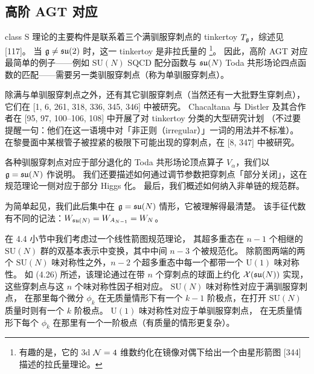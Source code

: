 \subsection{高阶 AGT 对应}

class S 理论的主要构件是联系着三个满驯服穿刺点的 tinkertoy $T_{\mathfrak{g}}$，综述见 [117]。
当 $\mathfrak{g}\ne\mathfrak{su}(2)$ 时，这一 tinkertoy 是非拉氏量的
\footnote{有趣的是，它的 3d $\mathcal{N}=4$ 维数约化在镜像对偶下给出一个由星形箭图 [344] 描述的拉氏量理论。}。
因此，高阶 AGT 对应最简单的例子------例如 $\mathrm{SU}(N)$ SQCD 配分函数与 $\mathfrak{su}(N)$ Toda
共形场论四点函数的匹配------需要另一类驯服穿刺点（称为单驯服穿刺点）。

除满与单驯服穿刺点之外，还有其它驯服穿刺点（当然还有一大批野生穿刺点），
它们在 [1, 6, 261, 318, 336, 345, 346] 中被研究。
Chacaltana 与 Distler 及其合作者在 [95, 97, 100--106, 108] 中开展了对 tinkertoy 分类的大型研究计划
（不过要提醒一句：他们在这一语境中对「非正则（irregular）」一词的用法并不标准）。
在黎曼面中某根管子被捏紧的极限下可能出现的穿刺点，在 [8, 347] 中被研究。

各种驯服穿刺点对应于部分退化的 Toda 共形场论顶点算子 $V_\alpha$，我们以 $\mathfrak{g}=\mathfrak{su}(N)$ 作说明。
我们还要描述如何通过调节参数把穿刺点「部分关闭」，这在规范理论一侧对应于部分 Higgs 化。
最后，我们概述如何纳入非单链的规范群。

为简单起见，我们此后集中在 $\mathfrak{g}=\mathfrak{su}(N)$ 情形，它被理解得最清楚。
该手征代数有不同的记法：$W_{\mathfrak{su}(N)}=W_{A_{N-1}}=W_N$。

在 4.4 小节中我们考虑过一个线性箭图规范理论，
其超多重态在 $n-1$ 个相继的 $\mathrm{SU}(N)$ 群的双基本表示中变换，其中中间 $n-3$ 个被规范化。
除箭图两端的两个 $\mathrm{SU}(N)$ 味对称性之外，$n-2$ 个超多重态中每一个都带一个 $\mathrm{U}(1)$ 味对称性。
如 (4.26) 所述，该理论通过在带 $n$ 个穿刺点的球面上约化 $\mathcal{X}(\mathfrak{su}(N))$ 实现，
这些穿刺点与这 $n$ 个味对称性因子相对应。
$\mathrm{SU}(N)$ 味对称性对应于满驯服穿刺点，
在那里每个微分 $\phi_k$ 在无质量情形下有一个 $k-1$ 阶极点，在打开 $\mathrm{SU}(N)$ 质量时则有一个 $k$ 阶极点。
$\mathrm{U}(1)$ 味对称性对应于单驯服穿刺点，
在无质量情形下每个 $\phi_k$ 在那里有一个一阶极点（有质量的情形更复杂）。

